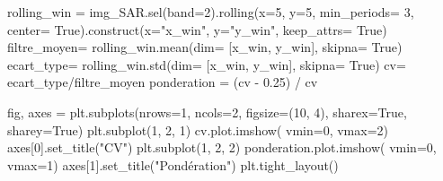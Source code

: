 \documentclass[
  11pt,
  letterpaper,
  open=any,
  twoside=false,
  french]{scrbook}
\newenvironment{Shaded}{\begin{snugshade}}{\end{snugshade}}
\newcommand{\DecValTok}[1]{\textcolor[rgb]{0.68,0.00,0.00}{#1}}
\newcommand{\FloatTok}[1]{\textcolor[rgb]{0.68,0.00,0.00}{#1}}
\newcommand{\NormalTok}[1]{\textcolor[rgb]{0.00,0.23,0.31}{#1}}
\newcommand{\OperatorTok}[1]{\textcolor[rgb]{0.37,0.37,0.37}{#1}}
\newcommand{\StringTok}[1]{\textcolor[rgb]{0.13,0.47,0.30}{#1}}
\newcommand{\VariableTok}[1]{\textcolor[rgb]{0.07,0.07,0.07}{#1}}
\begin{document}
\begin{Shaded}
\begin{Highlighting}[]
\NormalTok{rolling\_win }\OperatorTok{=}\NormalTok{ img\_SAR.sel(band}\OperatorTok{=}\DecValTok{2}\NormalTok{).rolling(x}\OperatorTok{=}\DecValTok{5}\NormalTok{, y}\OperatorTok{=}\DecValTok{5}\NormalTok{,  min\_periods}\OperatorTok{=} \DecValTok{3}\NormalTok{, center}\OperatorTok{=} \VariableTok{True}\NormalTok{).construct(x}\OperatorTok{=}\StringTok{"x\_win"}\NormalTok{, y}\OperatorTok{=}\StringTok{"y\_win"}\NormalTok{, keep\_attrs}\OperatorTok{=} \VariableTok{True}\NormalTok{)}
\NormalTok{filtre\_moyen}\OperatorTok{=}\NormalTok{ rolling\_win.mean(dim}\OperatorTok{=}\NormalTok{ [}\StringTok{\textquotesingle{}x\_win\textquotesingle{}}\NormalTok{, }\StringTok{\textquotesingle{}y\_win\textquotesingle{}}\NormalTok{], skipna}\OperatorTok{=} \VariableTok{True}\NormalTok{)}
\NormalTok{ecart\_type}\OperatorTok{=}\NormalTok{ rolling\_win.std(dim}\OperatorTok{=}\NormalTok{ [}\StringTok{\textquotesingle{}x\_win\textquotesingle{}}\NormalTok{, }\StringTok{\textquotesingle{}y\_win\textquotesingle{}}\NormalTok{], skipna}\OperatorTok{=} \VariableTok{True}\NormalTok{)}
\NormalTok{cv}\OperatorTok{=}\NormalTok{ ecart\_type}\OperatorTok{/}\NormalTok{filtre\_moyen}
\NormalTok{ponderation }\OperatorTok{=}\NormalTok{ (cv }\OperatorTok{{-}} \FloatTok{0.25}\NormalTok{) }\OperatorTok{/}\NormalTok{ cv}

\NormalTok{fig, axes }\OperatorTok{=}\NormalTok{ plt.subplots(nrows}\OperatorTok{=}\DecValTok{1}\NormalTok{, ncols}\OperatorTok{=}\DecValTok{2}\NormalTok{, figsize}\OperatorTok{=}\NormalTok{(}\DecValTok{10}\NormalTok{, }\DecValTok{4}\NormalTok{), sharex}\OperatorTok{=}\VariableTok{True}\NormalTok{, sharey}\OperatorTok{=}\VariableTok{True}\NormalTok{)}
\NormalTok{plt.subplot(}\DecValTok{1}\NormalTok{, }\DecValTok{2}\NormalTok{, }\DecValTok{1}\NormalTok{)}
\NormalTok{cv.plot.imshow( vmin}\OperatorTok{=}\DecValTok{0}\NormalTok{, vmax}\OperatorTok{=}\DecValTok{2}\NormalTok{)}
\NormalTok{axes[}\DecValTok{0}\NormalTok{].set\_title(}\StringTok{"CV"}\NormalTok{)}
\NormalTok{plt.subplot(}\DecValTok{1}\NormalTok{, }\DecValTok{2}\NormalTok{, }\DecValTok{2}\NormalTok{)}
\NormalTok{ponderation.plot.imshow( vmin}\OperatorTok{=}\DecValTok{0}\NormalTok{, vmax}\OperatorTok{=}\DecValTok{1}\NormalTok{) }
\NormalTok{axes[}\DecValTok{1}\NormalTok{].set\_title(}\StringTok{"Pondération"}\NormalTok{)}
\NormalTok{plt.tight\_layout()}
\end{Highlighting}
\end{Shaded}
\end{document}

